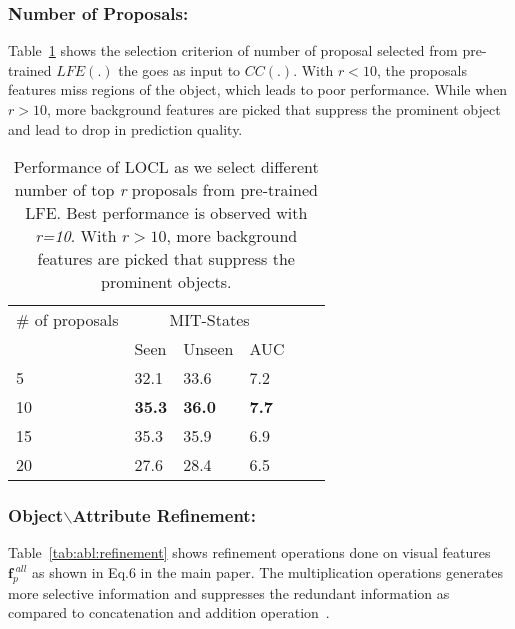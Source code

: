 \documentclass{bmvc2k}
\newcommand{\tablelightgray}{\rowcolor[gray]{.95}}
\begin{document}
\subsubsection{Number of Proposals:}
Table~\ref{tab:abl:num_prop} shows the selection criterion of number of proposal selected from pre-trained $LFE(.)$ the goes as input to $CC(.)$. With $r<10$, the proposals features miss regions of the object, which leads to poor performance. While when $r>10$, more background features are picked that suppress the prominent object and lead to drop in prediction quality.

\begin{table}[h]
\centering
\begin{tabular}{l|lllll}
\# of proposals & \multicolumn{3}{c}{MIT-States}               \\ 
               & Seen          & Unseen         & AUC          \\ \hline
\tablelightgray
5              & 32.1         & 33.6          & 7.2          \\
10             & \textbf{35.3} & \textbf{36.0} & \textbf{7.7} \\
\tablelightgray
15             & 35.3         & 35.9          & 6.9          \\
20             & 27.6         & 28.4          & 6.5          \\ \hline
\end{tabular}
\vspace{0.1cm}
\caption{Performance of LOCL as we select different number of top \textit{r} proposals from pre-trained LFE. Best performance is observed with \textit{r=10}. With $r>10$, more background features are picked that suppress the prominent objects.}
\label{tab:abl:num_prop}
\end{table}

\subsubsection{Object$\backslash$Attribute Refinement:}
Table~\ref{tab:abl:refinement} shows refinement operations done on visual features $\textbf{f}^{\;all}_p$ as shown in Eq.6 in the main paper. The multiplication operations generates more selective information and suppresses the redundant information as compared to concatenation and addition operation~\cite{ulutan2020vsgnet,iftekhar2021gtnet}.
\end{document}
